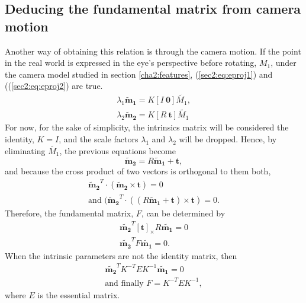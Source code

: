 \subsection{Deducing the fundamental matrix from camera motion}
Another way of obtaining this relation is through the camera motion.
If the point in the real world is expressed in the eye's perspective before rotating, $M_1$, under the camera model studied in section \ref{cha2:features}, (\ref{sec2:eq:eproj1}) and ((\ref{sec2:eq:eproj2}) are true.
\begin{align}
\label{sec2:eq:eproj1}
\lambda_1 \mathbf{\tilde{m}_1} = K [ I \ \mathbf{0} ] \tilde{M_1}, \\
\label{sec2:eq:eproj2}
\lambda_2 \mathbf{\tilde{m}_2} = K [ R \ \mathbf{t} ] \tilde{M_1}
\end{align}
For now, for the sake of simplicity, the intrinsics matrix will be considered the identity, $K= I$, and the scale factors $\lambda_1$ and $\lambda_2$ will be dropped. Hence, by eliminating $\tilde{M_1}$, the previous equations become
\begin{equation}
\label{sec2:eq:elimp}
\mathbf{\tilde{m}_2} = R   \mathbf{\tilde{m}_1} + \mathbf{t},
\end{equation}
and because the cross product of two vectors is orthogonal to them both,  
\begin{align}
	\label{sec2:eq:fundm1}
	\mathbf{\tilde{m}_2}^T \cdot ( \mathbf{\tilde{m}_2} \times \mathbf{t}) = 0 \\
	\label{sec2:eq:fundm2}
	\text{and } ( \mathbf{\tilde{m}_2}^T\cdot((R  \mathbf{\tilde{m}_1} + \mathbf{t}) \times \mathbf{t}) = 0.
\end{align}
Therefore, the fundamental matrix, $F$, can be determined by 
\begin{equation}
\label{sec2:eq:fundm3}
\begin{aligned}
\mathbf{\tilde{m_2}}^T [\mathbf{t}]_\times R \mathbf{\tilde{m_1}} = 0 \\
\mathbf{\tilde{m_2}}^T F \mathbf{\tilde{m_1}} = 0.
\end{aligned}
\end{equation}
When the intrinsic parameters are not the identity matrix, then 
\begin{equation}
\begin{aligned}
\label{hhh}
\mathbf{\tilde{m_2}}^T K^{-T} E K^{-1} \mathbf{\tilde{m_1}} = 0 \\
\text{and finally }
F = K^{-T}  E K^{-1},
\end{aligned}
\end{equation}
where $E$ is the essential matrix.


